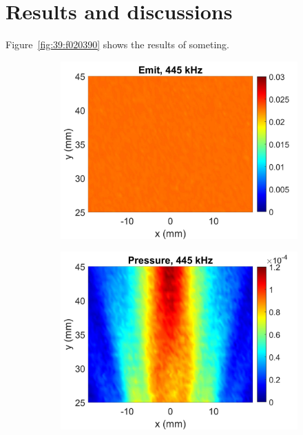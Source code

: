\documentclass{article}
\begin{document}
\section{Results and discussions}
Figure~\ref{fig:39:f020390} shows the results of someting.
\begin{figure}[!htb]
    \centering
    \begin{subfigure}{0.32\textwidth}
        \centering
        \includegraphics[width = \textwidth]{../../matlab/exp/fig/AnalyzeData_230227D_Exp230223B_EmitPrs}
        \caption{}
    \end{subfigure}
    \begin{subfigure}{0.32\textwidth}
        \centering
        \includegraphics[width = \textwidth]{../../matlab/exp/fig/AnalyzeData_230227D_Exp230223B_RecPrs.jpg}

\end{subfigure}
\end{figure}
\end{document}
